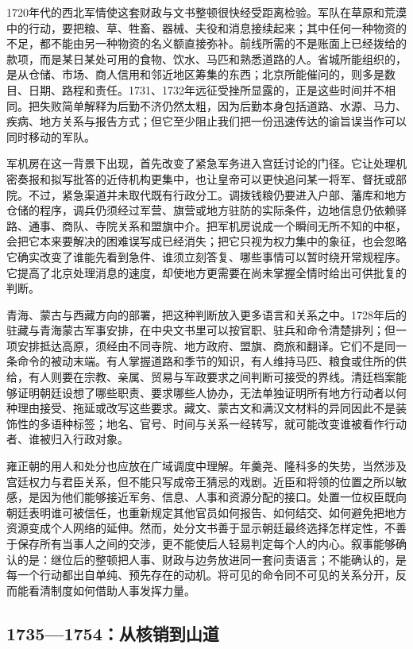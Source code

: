 1720年代的西北军情使这套财政与文书整顿很快经受距离检验。军队在草原和荒漠中的行动，要把粮、草、牲畜、器械、夫役和消息接续起来；其中任何一种物资的不足，都不能由另一种物资的名义额直接弥补。前线所需的不是账面上已经拨给的款项，而是某日某处可用的食物、饮水、马匹和熟悉道路的人。省城所能组织的，是从仓储、市场、商人信用和邻近地区筹集的东西；北京所能催问的，则多是数目、日期、路程和责任。1731、1732年远征受挫所显露的，正是这些时间并不相同。把失败简单解释为后勤不济仍然太粗，因为后勤本身包括道路、水源、马力、疾病、地方关系与报告方式；但它至少阻止我们把一份迅速传达的谕旨误当作可以同时移动的军队。

军机房在这一背景下出现，首先改变了紧急军务进入宫廷讨论的门径。它让处理机密奏报和拟写批答的近侍机构更集中，也让皇帝可以更快追问某一将军、督抚或部院。不过，紧急渠道并未取代既有行政分工。调拨钱粮仍要进入户部、藩库和地方仓储的程序，调兵仍须经过军营、旗营或地方驻防的实际条件，边地信息仍依赖驿路、通事、商队、寺院关系和盟旗中介。把军机房说成一个瞬间无所不知的中枢，会把它本来要解决的困难误写成已经消失；把它只视为权力集中的象征，也会忽略它确实改变了谁能先看到急件、谁须立刻答复、哪些事情可以暂时绕开常规程序。它提高了北京处理消息的速度，却使地方更需要在尚未掌握全情时给出可供批复的判断。

青海、蒙古与西藏方向的部署，把这种判断放入更多语言和关系之中。1728年后的驻藏与青海蒙古军事安排，在中央文书里可以按官职、驻兵和命令清楚排列；但一项安排抵达高原，须经由不同寺院、地方政府、盟旗、商旅和翻译。它们不是同一条命令的被动末端。有人掌握道路和季节的知识，有人维持马匹、粮食或住所的供给，有人则要在宗教、亲属、贸易与军政要求之间判断可接受的界线。清廷档案能够证明朝廷设想了哪些职责、要求哪些人协办，无法单独证明所有地方行动者以何种理由接受、拖延或改写这些要求。藏文、蒙古文和满汉文材料的异同因此不是装饰性的多语种标签；地名、官号、时间与关系一经转写，就可能改变谁被看作行动者、谁被归入行政对象。

雍正朝的用人和处分也应放在广域调度中理解。年羹尧、隆科多的失势，当然涉及宫廷权力与君臣关系，但不能只写成帝王猜忌的戏剧。近臣和将领的位置之所以敏感，是因为他们能够接近军务、信息、人事和资源分配的接口。处置一位权臣既向朝廷表明谁可被信任，也重新规定其他官员如何报告、如何结交、如何避免把地方资源变成个人网络的延伸。然而，处分文书善于显示朝廷最终选择怎样定性，不善于保存所有当事人之间的交涉，更不能使后人轻易判定每个人的内心。叙事能够确认的是：继位后的整顿把人事、财政与边务放进同一套问责语言；不能确认的，是每一个行动都出自单纯、预先存在的动机。将可见的命令同不可见的关系分开，反而能看清制度如何借助人事发挥力量。

\subsection{1735—1754：从核销到山道}

